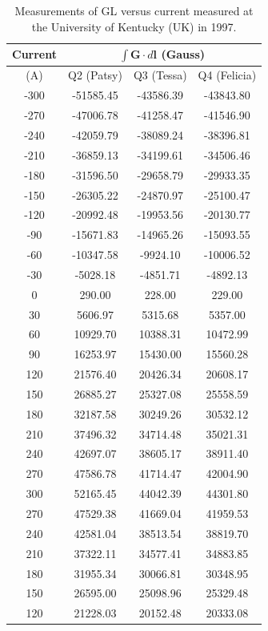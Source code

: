 \documentclass[12pt]{article}
\begin{document}
\begin{table}[!ht]
\begin{center}
\caption{\label{tab:PTF_GLvsCurUK}Measurements of GL versus current measured at the University of Kentucky (UK) in 1997.}
\begin{tabular}{|c|c|c|c|}
\hline				
Current&\multicolumn{3}{|c|}{	$\int \mathbf{G} \cdot d\mathbf{l}$ (Gauss)}\\\hline		
(A) 	&Q2 (Patsy)	&Q3 (Tessa)	&Q4 (Felicia)\\\hline
-300	&-51585.45	&-43586.39	&-43843.80\\
-270	&-47006.78	&-41258.47	&-41546.90\\
-240	&-42059.79	&-38089.24	&-38396.81\\
-210	&-36859.13	&-34199.61	&-34506.46\\
-180	&-31596.50	&-29658.79	&-29933.35\\
-150	&-26305.22	&-24870.97	&-25100.47\\
-120	&-20992.48	&-19953.56	&-20130.77\\
-90	&-15671.83	&-14965.26	&-15093.55\\
-60	&-10347.58	&-9924.10		&-10006.52\\
-30	&-5028.18		&-4851.71		&-4892.13\\
0	&290.00		&228.00		&229.00\\
30	&5606.97		&5315.68		&5357.00\\
60	&10929.70	&10388.31	&10472.99\\
90	&16253.97	&15430.00	&15560.28\\
120	&21576.40	&20426.34	&20608.17\\
150	&26885.27	&25327.08	&25558.59\\
180	&32187.58	&30249.26	&30532.12\\
210	&37496.32	&34714.48	&35021.31\\
240	&42697.07	&38605.17	&38911.40\\
270	&47586.78	&41714.47	&42004.90\\
300	&52165.45	&44042.39	&44301.80\\
270	&47529.38	&41669.04	&41959.53\\
240	&42581.04	&38513.54	&38819.70\\
210	&37322.11	&34577.41	&34883.85\\
180	&31955.34	&30066.81	&30348.95\\
150	&26595.00	&25098.96	&25329.48\\
120	&21228.03	&20152.48	&20333.08\\

\end{tabular}
\end{center}
\end{table}
\end{document}
